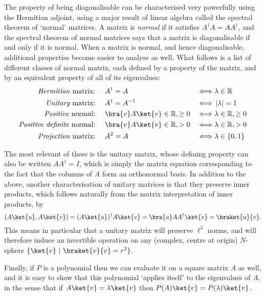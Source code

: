 The property of being diagonalisable can be characterised very powerfully using the Hermitian adjoint, using a major result of linear algebra called the spectral theorem of `normal' matrices. A matrix is \emph{normal} if it satisfies $A^\dagger A = AA^\dagger$, and the spectral theorem of normal matrices says that a matrix is diagonalisable if and only if it is normal. When a matrix is normal, and hence diagonalisable, additional properties become easier to analyse as well. What follows is a list of different classes of normal matrix, each defined by a property of the matrix, and by an equivalent property of all of its eigenvalues:
\begin{align*}
	\text{\emph{Hermitian} matrix:\ }&&& A^\dagger = A & \iff& \lambda \in \mathbb{R} \\
	\text{\emph{Unitary} matrix:\ }&&& A^\dagger = A^{-1} & \iff& \ord{\lambda}=1 \\
	\text{\emph{Positive} normal:\ }&&& \bra{v}A\ket{v} \in \mathbb{R}, \geq 0 & \iff& \lambda \in \mathbb{R}, \geq 0 \\
	\text{\emph{Positive definite} normal:\ }&&& \bra{v}A\ket{v} \in \mathbb{R}, > 0 & \iff& \lambda \in \mathbb{R}, > 0 \\
	\text{\emph{Projection} matrix:\ }&&& A^2 = A & \iff& \lambda \in \{0, 1\} \\
\end{align*}

The most relevant of these is the unitary matrix, whose defining property can also be written $AA^\dagger = I$, which is simply the matrix equation corresponding to the fact that the columns of $A$ form an orthonormal basis. In addition to the above, another characterisation of unitary matrices is that they preserve inner products, which follows naturally from the matrix interpretation of inner products, by
\[(A\ket{u}, A\ket{v}) = (A\ket{u})^\dagger A\ket{v} = \bra{u}AA^\dagger \ket{v} = \braket{u}{v}.\]
This means in particular that a unitary matrix will preserve $\ell^2$ norms, and will therefore induce an invertible operation on any (complex, centre at origin) $N$-sphere $\{\ket{v}\ |\ \braket{v}{v} = r^2\}$.

Finally, if $P$ is a polynomial then we can evaluate it on a square matrix $A$ as well, and it is easy to show that this polynomial `applies itself' to the eigenvalues of $A$, in the sense that if $A\ket{v} = \lambda\ket{v}$ then $P(A)\ket{v} = P(\lambda)\ket{v}$.

